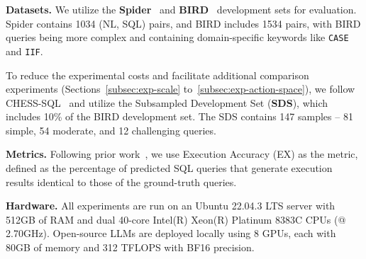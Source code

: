 \textbf{Datasets.}
We utilize the \textbf{Spider}~\cite{spider} and  \textbf{BIRD}~\cite{bird} development sets for evaluation.
Spider contains 1034 (NL, SQL) pairs, and BIRD includes 1534 pairs, with BIRD queries being more complex and containing domain-specific keywords like \texttt{CASE} and \texttt{IIF}.

To reduce the experimental costs and facilitate additional comparison experiments (Sections~\ref{subsec:exp-scale} to~\ref{subsec:exp-action-space}), we follow CHESS-SQL~\cite{chesssql} and utilize the Subsampled Development Set (\textbf{SDS}), which includes 10\% of the BIRD development set. The SDS contains 147 samples -- 81 simple, 54 moderate, and 12 challenging queries.







\textbf{Metrics.}
Following prior work~\cite{CHASE}, we use Execution Accuracy (EX) as the metric, defined as the percentage of predicted SQL queries that generate execution results identical to those of the ground-truth queries.


\textbf{Hardware.}
All experiments are run on an Ubuntu 22.04.3 LTS server with 512GB of RAM and dual 40-core Intel(R) Xeon(R) Platinum 8383C CPUs (@ 2.70GHz). Open-source LLMs are deployed locally using 8 GPUs, each with 80GB of memory and 312 TFLOPS with BF16 precision.


